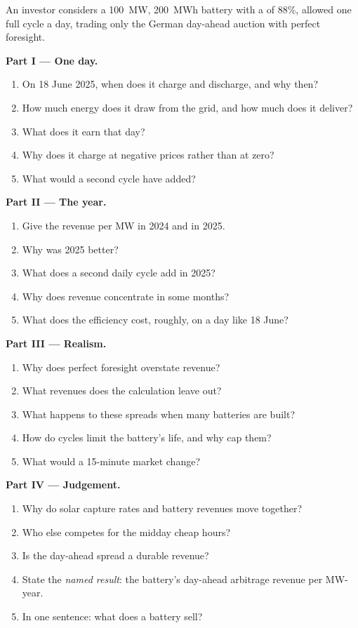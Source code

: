 \begin{problem}\label{pb:m3:power-markets-trading:1}
An investor considers a 100~MW, 200~MWh battery with a  of 88\%, allowed
one full cycle a day, trading only the German day-ahead auction with perfect foresight.

\medskip\noindent\textbf{Part I --- One day.}
\begin{enumerate}
\item On 18 June 2025, when does it charge and discharge, and why then?
\item How much energy does it draw from the grid, and how much does it deliver?
\item What does it earn that day?
\item Why does it charge at negative prices rather than at zero?
\item What would a second cycle have added?
\end{enumerate}

\medskip\noindent\textbf{Part II --- The year.}
\begin{enumerate}[resume]
\item Give the revenue per MW in 2024 and in 2025.
\item Why was 2025 better?
\item What does a second daily cycle add in 2025?
\item Why does revenue concentrate in some months?
\item What does the efficiency cost, roughly, on a day like 18 June?
\end{enumerate}

\medskip\noindent\textbf{Part III --- Realism.}
\begin{enumerate}[resume]
\item Why does perfect foresight overstate revenue?
\item What revenues does the calculation leave out?
\item What happens to these spreads when many batteries are built?
\item How do cycles limit the battery's life, and why cap them?
\item What would a 15-minute market change?
\end{enumerate}

\medskip\noindent\textbf{Part IV --- Judgement.}
\begin{enumerate}[resume]
\item Why do solar capture rates and battery revenues move together?
\item Who else competes for the midday cheap hours?
\item Is the day-ahead spread a durable revenue?
\item State the \emph{named result}: the battery's day-ahead arbitrage revenue per MW-year.
\item In one sentence: what does a battery sell?
\end{enumerate}
\end{problem}

